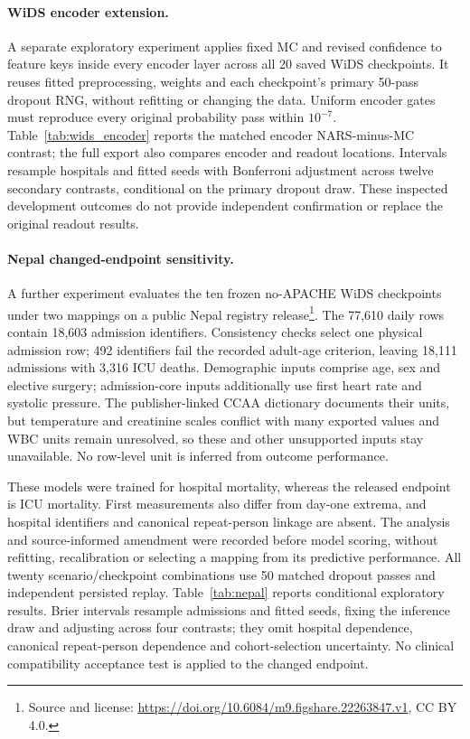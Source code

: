 \documentclass{article}
\begin{document}
\paragraph{WiDS encoder extension.} A separate exploratory experiment applies fixed MC and revised confidence to feature keys inside every encoder layer across all 20 saved WiDS checkpoints. It reuses fitted preprocessing, weights and each checkpoint's primary 50-pass dropout RNG, without refitting or changing the data. Uniform encoder gates must reproduce every original probability pass within $10^{-7}$. Table~\ref{tab:wids_encoder} reports the matched encoder NARS-minus-MC contrast; the full export also compares encoder and readout locations. Intervals resample hospitals and fitted seeds with Bonferroni adjustment across twelve secondary contrasts, conditional on the primary dropout draw. These inspected development outcomes do not provide independent confirmation or replace the original readout results.



\paragraph{Nepal changed-endpoint sensitivity.} A further experiment evaluates the ten frozen no-APACHE WiDS checkpoints under two mappings on a public Nepal registry release\footnote{Source and license: \url{https://doi.org/10.6084/m9.figshare.22263847.v1}, CC BY 4.0.}. The 77,610 daily rows contain 18,603 admission identifiers. Consistency checks select one physical admission row; 492 identifiers fail the recorded adult-age criterion, leaving 18,111 admissions with 3,316 ICU deaths. Demographic inputs comprise age, sex and elective surgery; admission-core inputs additionally use first heart rate and systolic pressure. The publisher-linked CCAA dictionary documents their units, but temperature and creatinine scales conflict with many exported values and WBC units remain unresolved, so these and other unsupported inputs stay unavailable. No row-level unit is inferred from outcome performance.

These models were trained for hospital mortality, whereas the released endpoint is ICU mortality. First measurements also differ from day-one extrema, and hospital identifiers and canonical repeat-person linkage are absent. The analysis and source-informed amendment were recorded before model scoring, without refitting, recalibration or selecting a mapping from its predictive performance. All twenty scenario/checkpoint combinations use 50 matched dropout passes and independent persisted replay. Table~\ref{tab:nepal} reports conditional exploratory results. Brier intervals resample admissions and fitted seeds, fixing the inference draw and adjusting across four contrasts; they omit hospital dependence, canonical repeat-person dependence and cohort-selection uncertainty. No clinical compatibility acceptance test is applied to the changed endpoint.
\end{document}
